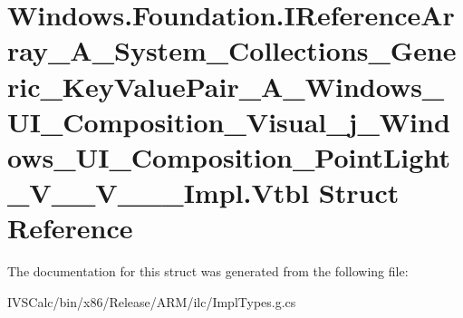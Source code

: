 \hypertarget{struct_windows_1_1_foundation_1_1_i_reference_array___a___system___collections___generic___key_vb3f008440dc35cc813a9cb02c9c0865a}{}\section{Windows.\+Foundation.\+I\+Reference\+Array\+\_\+\+A\+\_\+\+System\+\_\+\+Collections\+\_\+\+Generic\+\_\+\+Key\+Value\+Pair\+\_\+\+A\+\_\+\+Windows\+\_\+\+U\+I\+\_\+\+Composition\+\_\+\+Visual\+\_\+j\+\_\+\+Windows\+\_\+\+U\+I\+\_\+\+Composition\+\_\+\+Point\+Light\+\_\+\+V\+\_\+\+\_\+\+V\+\_\+\+\_\+\+\_\+\+Impl.\+Vtbl Struct Reference}
\label{struct_windows_1_1_foundation_1_1_i_reference_array___a___system___collections___generic___key_vb3f008440dc35cc813a9cb02c9c0865a}


The documentation for this struct was generated from the following file\+:\begin{DoxyCompactItemize}
\item 
I\+V\+S\+Calc/bin/x86/\+Release/\+A\+R\+M/ilc/Impl\+Types.\+g.\+cs\end{DoxyCompactItemize}
